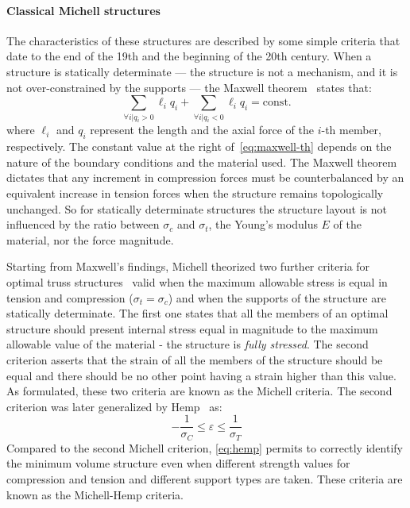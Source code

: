 \paragraph{Classical Michell structures}
The characteristics of these structures are described by some simple criteria that date to the end of the 19th and the beginning of the 20th century. When a structure is statically determinate — \ie the structure is not a mechanism, and it is not over-constrained by the supports — the Maxwell theorem~ states that:
\begin{equation} \label{eq:maxwell-th}
    \sum_{\forall i | q_i>0}\ell_iq_i + \sum_{\forall i | q_i<0}\ell_iq_i = \textrm{const.}
\end{equation}
where $\ell_i$ and $q_i$ represent the length and the axial force of the $i$-th member, respectively. The constant value at the right of~\eqref{eq:maxwell-th} depends on the nature of the boundary conditions and the material used. The Maxwell theorem dictates that any increment in compression forces must be counterbalanced by an equivalent increase in tension forces when the structure remains topologically unchanged. So for statically determinate structures the structure layout is not influenced by the ratio between $\sigma_c$ and $\sigma_t$, the Young's modulus $E$ of the material, nor the force magnitude.

Starting from Maxwell's findings, Michell theorized two further criteria for optimal truss structures~ valid when the maximum allowable stress is equal in tension and compression ($\sigma_t = \sigma_c$) and when the supports of the structure are statically determinate. The first one states that all the members of an optimal structure should present internal stress equal in magnitude to the maximum allowable value of the material - \ie the structure is \textit{fully stressed}. The second criterion asserts that the strain of all the members of the structure should be equal and there should be no other point having a strain higher than this value. As formulated, these two criteria are known as the Michell criteria. The second criterion was later generalized by Hemp~ as:
\begin{equation} \label{eq:hemp}
    -\frac{1}{\sigma_C}\leq \varepsilon \leq \frac{1}{\sigma_T}
\end{equation}
Compared to the second Michell criterion, \eqref{eq:hemp} permits to correctly identify the minimum volume structure even when different strength values for compression and tension and different support types are taken. These criteria are known as the Michell-Hemp criteria.

